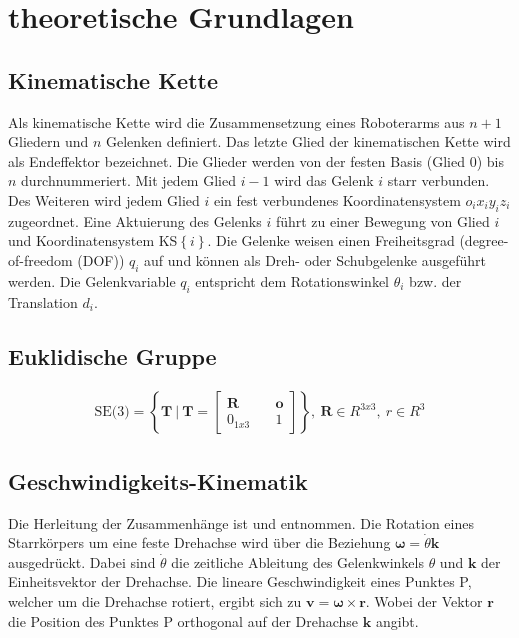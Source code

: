 \setcounter{chapter}{1}
\setcounter{section}{1}
\setcounter{table}{0}
\setcounter{figure}{0}
%
\section{theoretische Grundlagen}
\subsection{Kinematische Kette}
\label{add:kinematische-kette}
Als kinematische Kette wird die Zusammensetzung eines Roboterarms aus $n+1$ Gliedern und $n$ Gelenken definiert. Das letzte Glied der kinematischen Kette wird als Endeffektor bezeichnet. Die Glieder werden von der festen Basis (Glied $0$) bis $n$ durchnummeriert. Mit jedem Glied $i-1$ wird das Gelenk $i$ starr verbunden. Des Weiteren wird jedem Glied $i$ ein fest verbundenes Koordinatensystem $o_ix_iy_iz_i$ zugeordnet. Eine Aktuierung des Gelenks $i$ führt zu einer Bewegung von Glied $i$ und Koordinatensystem KS$\left\{i\right\}$. Die Gelenke weisen einen Freiheitsgrad (degree-of-freedom (DOF)) $q_i$ auf und können als Dreh- oder Schubgelenke ausgeführt werden. Die Gelenkvariable $q_i$ entspricht dem Rotationswinkel $\theta_i$ bzw. der Translation $d_i$. \cite[S.~75]{Spong.2020}
%
\subsection{Euklidische Gruppe}
\label{add:SE3}
\begin{align} 
	\text{SE(3)} = \left\{{\bm{T}} \ | \ \bm{T}=\begin{bmatrix} {\bm{R}} &\quad {\bm{o}}\\ {0}_{1x3} &\quad 1 \end{bmatrix}\right\}, \ \bm{R} \in {R}^{3x3}, \ {r} \in {R}^{3}  
\end{align} 

\cite[S.~534]{Spong.2020}

\subsection{Geschwindigkeits-Kinematik}
\label{add:geschwindigkeitskinematik}
Die Herleitung der Zusammenhänge ist  \cite[S.~79~f.]{Kemmetmueller.2023} und  \cite[S.~106]{Spong.2020} entnommen. Die Rotation eines Starrk{\"o}rpers um eine feste Drehachse wird über die Beziehung $\bm{\omega} = \dot{\theta}\bm{k}$ ausgedr{\"u}ckt. Dabei sind $\dot{\theta}$ die zeitliche Ableitung des Gelenkwinkels $\theta$ und $\bm{k}$ der Einheitsvektor der Drehachse. Die lineare Geschwindigkeit eines Punktes P, welcher um die Drehachse rotiert, ergibt sich zu $\bm{v} = \bm{\omega} \times \bm{r}$. Wobei der Vektor $\bm{r}$ die Position des Punktes P orthogonal auf der Drehachse $\bm{k}$ angibt. \cite[S.~102]{Spong.2020} 
%
